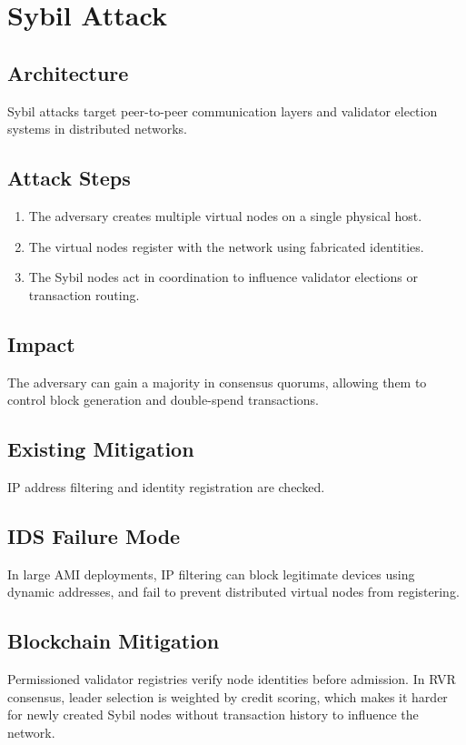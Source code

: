 \documentclass[12pt, oneside, a4paper]{report}
\theoremstyle{definition}
\theoremstyle{remark}
\begin{document}
\bigskip

\section{Sybil Attack}
\label{sec:tm:sybil}

\subsection{Architecture}
Sybil attacks target peer-to-peer communication layers and validator election systems in distributed networks.

\subsection{Attack Steps}
\begin{enumerate}
  \item The adversary creates multiple virtual nodes on a single physical host.
  \item The virtual nodes register with the network using fabricated identities.
  \item The Sybil nodes act in coordination to influence validator elections or transaction routing.
\end{enumerate}

\subsection{Impact}
The adversary can gain a majority in consensus quorums, allowing them to control block generation and double-spend transactions.

\subsection{Existing Mitigation}
IP address filtering and identity registration are checked.

\subsection{IDS Failure Mode}
In large AMI deployments, IP filtering can block legitimate devices using dynamic addresses, and fail to prevent distributed virtual nodes from registering.

\subsection{Blockchain Mitigation}
Permissioned validator registries verify node identities before admission. In RVR consensus, leader selection is weighted by credit scoring, which makes it harder for newly created Sybil nodes without transaction history to influence the network.
\end{document}
